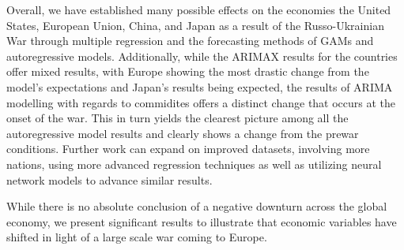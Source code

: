 \documentclass[11pt,regno]{amsart}
\theoremstyle{plain}
\numberwithin{equation}{section}
\begin{document}
Overall, we have established many possible effects on the economies the United States, European Union, China, and Japan as a result of the Russo-Ukrainian War through multiple regression and the forecasting methods of GAMs and autoregressive models. Additionally, while the ARIMAX results for the countries offer mixed results, with Europe showing the most drastic change from the model's expectations and Japan's results being expected,  the results of ARIMA modelling with regards to commidites offers a distinct change that occurs at the onset of the war. This in turn yields the clearest picture among all the autoregressive model results and clearly shows a change from the prewar conditions. Further work can expand on improved datasets, involving more nations, using more advanced regression techniques as well as utilizing neural network models to advance similar results.

While there is no absolute conclusion of a negative downturn across the global economy, we present significant results to illustrate that economic variables have shifted in light of a large scale war coming to Europe. 




\newpage
\end{document}
